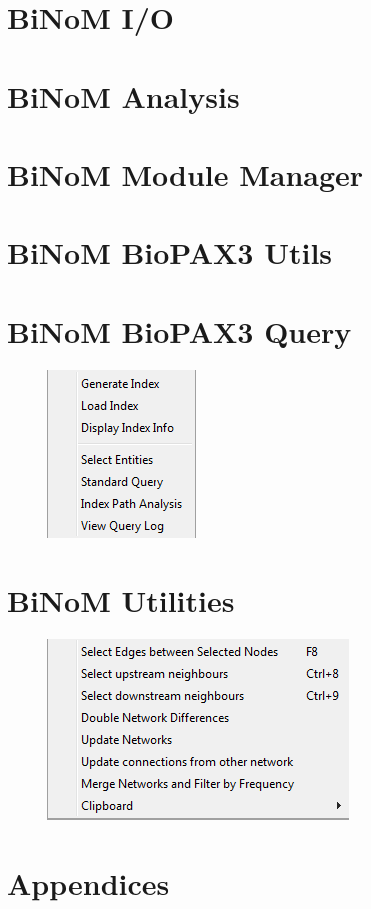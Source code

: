 \documentclass[11pt]{article}
\begin{document}
\section{BiNoM I/O}

\clearpage
\section{BiNoM Analysis}

\clearpage
\section{BiNoM Module Manager}

\clearpage
\section{BiNoM BioPAX3 Utils}

\clearpage
\section{BiNoM BioPAX3 Query}
\begin{figure}[h]
\includegraphics{graphics/BiNoM_BioPAX3_Query}
\end{figure}
\clearpage
\section{BiNoM Utilities}
\begin{figure}[h]
\includegraphics{graphics/BiNoM_Utilities}
\end{figure}
\clearpage
\section{Appendices}

\clearpage
 
 
\end{document}
